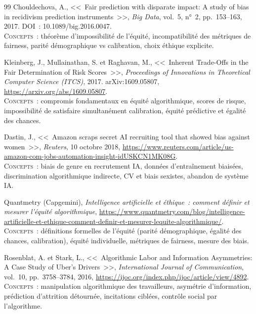 \documentclass[12pt,a4paper]{article}
\begin{document}
\begin{thebibliography}{99}
Chouldechova, A., <<~Fair prediction with disparate impact: A study of bias in recidivism prediction instruments~>>, \textit{Big Data}, vol.~5, n°~2, pp.~153--163, 2017. DOI~: 10.1089/big.2016.0047.
\\[2pt] {\small \textsc{Concepts~:} théorème d'impossibilité de l'équité, incompatibilité des métriques de fairness, parité démographique vs calibration, choix éthique explicite.}

Kleinberg, J., Mullainathan, S. et Raghavan, M., <<~Inherent Trade-Offs in the Fair Determination of Risk Scores~>>, \textit{Proceedings of Innovations in Theoretical Computer Science (ITCS)}, 2017. arXiv:1609.05807,
\url{https://arxiv.org/abs/1609.05807}.
\\[2pt] {\small \textsc{Concepts~:} compromis fondamentaux en équité algorithmique, scores de risque, impossibilité de satisfaire simultanément calibration, équité prédictive et égalité des chances.}

Dastin, J., <<~Amazon scraps secret AI recruiting tool that showed bias against women~>>, \textit{Reuters}, 10 octobre 2018,
\url{https://www.reuters.com/article/us-amazon-com-jobs-automation-insight-idUSKCN1MK08G}.
\\[2pt] {\small \textsc{Concepts~:} biais de genre en recrutement IA, données d'entraînement biaisées, discrimination algorithmique indirecte, CV et biais sexistes, abandon de système IA.}

Quantmetry (Capgemini), \textit{Intelligence artificielle et éthique~: comment définir et mesurer l'équité algorithmique},
\url{https://www.quantmetry.com/blog/intelligence-artificielle-et-ethique-comment-definir-et-mesurer-lequite-algorithmique/}.
\\[2pt] {\small \textsc{Concepts~:} définitions formelles de l'équité (parité démographique, égalité des chances, calibration), équité individuelle, métriques de fairness, mesure des biais.}


Rosenblat, A. et Stark, L., <<~Algorithmic Labor and Information Asymmetries: A Case Study of Uber's Drivers~>>, \textit{International Journal of Communication}, vol.~10, pp.~3758--3784, 2016,
\url{https://ijoc.org/index.php/ijoc/article/view/4892}.
\\[2pt] {\small \textsc{Concepts~:} manipulation algorithmique des travailleurs, asymétrie d'information, prédiction d'attrition détournée, incitations ciblées, contrôle social par l'algorithme.}


\end{thebibliography}
\end{document}
